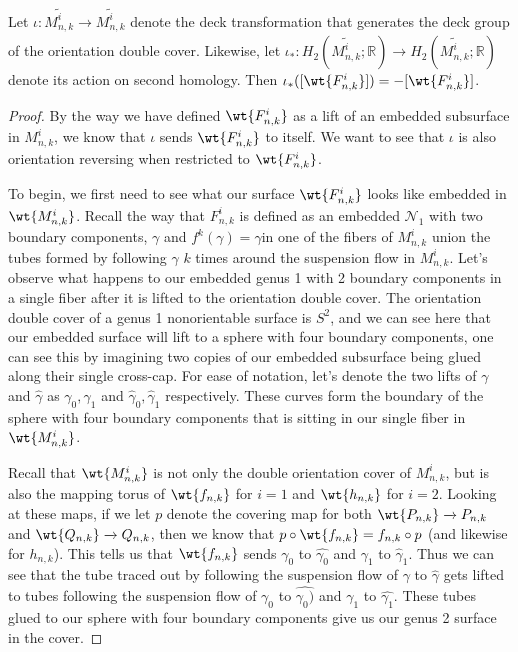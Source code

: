 \begin{lem}
Let $\iota: \widetilde{M^i_{n,k}} \xrightarrow[]{} \widetilde{M^i_{n,k}}$ denote the deck transformation that generates the deck group of the orientation double cover. Likewise, let $\iota_*: H_2(\widetilde{M^i_{n,k}};\mathbb{R}) \xrightarrow[]{} H_2(\widetilde{M^i_{n,k}};\mathbb{R})$ denote its action on second homology. Then $\iota_*([\wt{F^i_{n,k}}]) = -[\wt{F^i_{n,k}}]$.
\end{lem}
\begin{proof}

By the way we have defined $\wt{F^i_{n,k}}$ as a lift of an embedded subsurface in $M^i_{n,k}$, we know that $\iota$ sends $\wt{F^i_{n,k}}$ to itself. We want to see that $\iota$ is also orientation reversing when restricted to $\wt{F^i_{n,k}}$.

To begin, we first need to see what our surface $\wt{F^i_{n,k}}$ looks like embedded in $\wt{M^i_{n,k}}$. Recall the way that $F^i_{n,k}$ is defined as an embedded $\mathcal{N}_1$ with two boundary components, $\gamma$ and $f^k(\gamma) = \hat{\gamma}$in one of the fibers of $M^i_{n,k}$ union the tubes formed by following $\gamma$ $k$ times around the suspension flow in $M^i_{n,k}$. Let's observe what happens to our embedded genus 1 with 2 boundary components in a single fiber after it is lifted to the orientation double cover. The orientation double cover of a genus 1 nonorientable surface is $S^2$, and we can see here that our embedded surface will lift to a sphere with four boundary components, one can see this by imagining two copies of our embedded subsurface being glued along their single cross-cap. For ease of notation, let's denote the two lifts of $\gamma$ and $\hat{\gamma}$ as $\gamma_0,\gamma_1$ and $\hat{\gamma}_0,\hat{\gamma}_1$ respectively. These curves form the boundary of the sphere with four boundary components that is sitting in our single fiber in $\wt{M^i_{n,k}}$. 

Recall that $\wt{M^i_{n,k}}$ is not only the double orientation cover of $M^i_{n,k}$, but is also the mapping torus of $\wt{f_{n,k}}$ for $i = 1$ and $\wt{h_{n,k}}$ for $i = 2$. Looking at these maps, if we let $p$ denote the covering map for both $\wt{P_{n,k}} \xrightarrow[]{} P_{n,k}$ and $\wt{Q_{n,k}} \xrightarrow[]{} Q_{n,k}$, then we know that $p \circ \wt{f_{n,k}} = f_{n,k} \circ p$ (and likewise for $h_{n,k}$). This tells us that $\wt{f_{n,k}}$ sends $\gamma_0$ to $\hat{\gamma_0}$ and $\gamma_1$ to $\hat{\gamma}_1$. Thus we can see that the tube traced out by following the suspension flow of $\gamma$ to $\hat{\gamma}$ gets lifted to tubes following the suspension flow of $\gamma_0$ to $\hat{\gamma_0)}$ and $\gamma_1$ to $\hat{\gamma_1}$. These tubes glued to our sphere with four boundary components give us our genus 2 surface in the cover. 


\end{proof}
